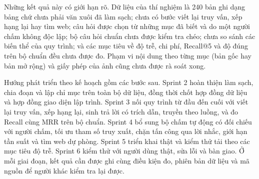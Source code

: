 Những kết quả này có giới hạn rõ. Dữ liệu của thí nghiệm là 240 bản ghi dạng bảng chứ chưa phải văn xuôi đã làm sạch; chưa có bước viết lại truy vấn, xếp hạng lại hay tìm web; câu hỏi được chọn từ những mục đã biết và do một người chấm không độc lập; bộ câu hỏi chuẩn chưa được kiểm tra chéo; chưa so sánh các biến thể của quy trình; và các mục tiêu về độ trễ, chi phí, Recall@5 và độ đúng trên bộ chuẩn đều chưa được đo. Phạm vi nội dung theo từng mục (bản gốc hay bản mở rộng) và giấy phép của ảnh cũng chưa được rà soát xong.


Hướng phát triển theo kế hoạch gồm các bước sau. Sprint 2 hoàn thiện làm sạch, chia đoạn và lập chỉ mục trên toàn bộ dữ liệu, đồng thời chốt hợp đồng dữ liệu và hợp đồng giao diện lập trình. Sprint 3 nối quy trình từ đầu đến cuối với viết lại truy vấn, xếp hạng lại, sinh trả lời có trích dẫn, truyền theo luồng, và đo Recall cùng MRR trên bộ chuẩn. Sprint 4 bổ sung bộ chấm tự động có đối chiếu với người chấm, tối ưu tham số truy xuất, chặn tấn công qua lời nhắc, giới hạn tần suất và tìm web dự phòng. Sprint 5 triển khai thật và kiểm thử tải theo các mục tiêu độ trễ. Sprint 6 kiểm thử với người dùng thật, sửa lỗi và bàn giao. Ở mỗi giai đoạn, kết quả cần được ghi cùng điều kiện đo, phiên bản dữ liệu và mã nguồn để người khác kiểm tra lại được.
